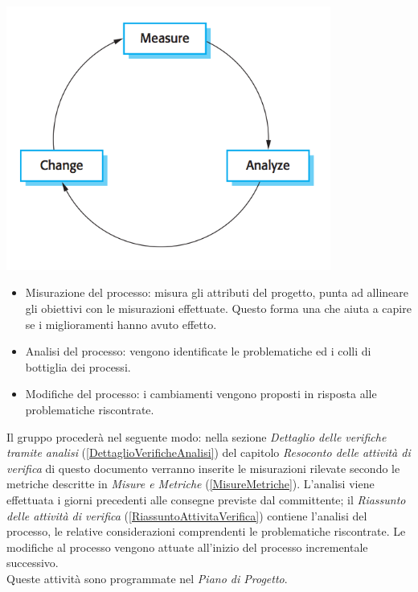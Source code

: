 	{ \centering \includegraphics[width=0.8\textwidth]{ProcessImprovementCycle.png} \\}
	\begin{itemize}
		\item Misurazione del processo: misura gli attributi del progetto, punta ad allineare gli obiettivi con le misurazioni effettuate. Questo forma una  che aiuta a capire se i miglioramenti hanno avuto effetto.
		\item Analisi del processo: vengono identificate le problematiche ed i colli di bottiglia dei processi.
		\item Modifiche del processo: i cambiamenti vengono proposti in risposta alle problematiche riscontrate.
	\end{itemize}
	
	Il gruppo procederà nel seguente modo: nella sezione \emph{Dettaglio delle verifiche tramite analisi} (\ref{DettaglioVerificheAnalisi}) del capitolo \emph{Resoconto delle attività di verifica} di questo documento verranno inserite le misurazioni rilevate secondo le metriche descritte in \emph{Misure e Metriche} (\ref{MisureMetriche}). L'analisi viene effettuata i giorni precedenti alle consegne previste dal committente; il \emph{Riassunto delle attività di verifica} (\ref{RiassuntoAttivitaVerifica}) contiene l'analisi del processo, le relative considerazioni  comprendenti le problematiche riscontrate.
	Le modifiche al processo vengono attuate all'inizio del processo incrementale successivo. \\
	Queste attività sono programmate nel \emph{Piano di Progetto}.
	

